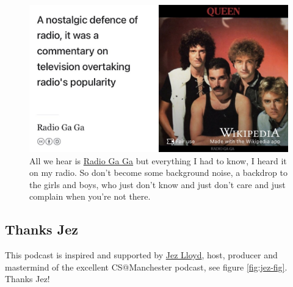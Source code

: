 \documentclass[
]{book}
\begin{document}
\begin{figure}

{\centering \includegraphics[width=0.99\linewidth]{images/Everything-I-had-to-know-I-heard-it-on-my-radio} 

}

\caption{All we hear is \href{https://en.wikipedia.org/wiki/Radio_Ga_Ga}{Radio Ga Ga} but everything I had to know, I heard it on my radio. \citep{radiogaga} So don't become some background noise, a backdrop to the girls and boys, who just don't know and just don't care and just complain when you're not there.}\label{fig:gaga-fig}
\end{figure}



\hypertarget{jez}{%
\subsection{Thanks Jez}\label{jez}}

This podcast is inspired and supported by \href{https://www.linkedin.com/in/jez-lloyd-84077069}{Jez Lloyd}, host, producer and mastermind of the excellent CS@Manchester podcast, see figure \ref{fig:jez-fig}. Thanks Jez! 🙏
\end{document}
